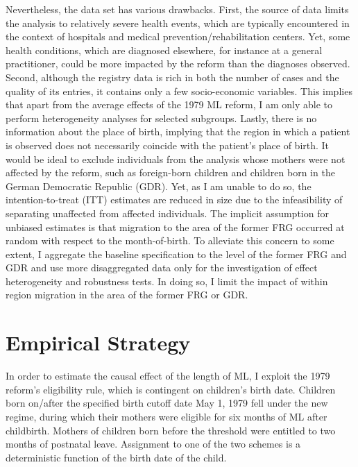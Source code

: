 Nevertheless, the data set has various drawbacks. First, the source of data limits the analysis to relatively severe health events, which are typically encountered in the context of hospitals and medical prevention/rehabilitation centers. Yet, some health conditions, which are diagnosed elsewhere, for instance at a general practitioner, could be more impacted by the reform than the diagnoses observed. %
Second, although the registry data is rich in both the number of cases and the quality of its entries, it contains only a few socio-economic variables. This implies that apart from the average effects of the 1979 ML reform, I am only able to perform heterogeneity analyses for selected subgroups. Lastly, there is no information about the place of birth, implying that the region in which a patient is observed does not necessarily coincide with the patient's place of birth. It would be ideal to exclude individuals from the analysis whose mothers were not affected by the reform, such as foreign-born children and children born in the German Democratic Republic (GDR). Yet, as I am unable to do so, the intention-to-treat (ITT) estimates are reduced in size due to the infeasibility of separating unaffected from affected individuals. The implicit assumption for unbiased estimates is that migration to the area of the former FRG occurred at random with respect to the month-of-birth. To alleviate this concern to some extent, I aggregate the baseline specification to the level of the former FRG and GDR and use more disaggregated data only for the investigation of effect heterogeneity and robustness tests. In doing so, I limit the impact of within region migration in the area of the former FRG or GDR.


















\bigskip
\section{Empirical Strategy}\label{sec_mlch:empirical_strategy}
In order to estimate the causal effect of the length of ML, I exploit the 1979 reform's eligibility rule, which is contingent on children's birth date. Children born on/after the specified birth cutoff date May 1, 1979 fell under the new regime, during which their mothers were eligible for six months of ML after childbirth. Mothers of children born before the threshold were entitled to two months of postnatal leave. Assignment to one of the two schemes is a deterministic function of the birth date of the child.


